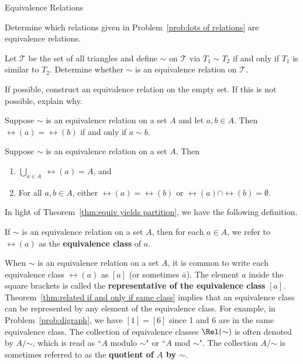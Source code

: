 \begin{section}{Equivalence Relations}
\begin{problem}\label{prob:equiv from lots of relations}
Determine which relations given in Problem~\ref{prob:lots of relations} are equivalence relations.
\end{problem}

\begin{problem}
Let $\mathcal{T}$ be the set of all triangles and define $\sim$ on $\mathcal{T}$ via $T_1\sim T_2$ if and only if $T_1$ is similar to $T_2$.  Determine whether $\sim$ is an equivalence relation on $\mathcal{T}$.
\end{problem}

\begin{problem}
If possible, construct an equivalence relation on the empty set.  If this is not possible, explain why.
\end{problem}

\begin{theorem}\label{thm:related if and only if same class}
Suppose $\sim$ is an equivalence relation on a set $A$ and let $a,b\in A$.  Then $\rel(a)=\rel(b)$ if and only if $a\sim b$.
\end{theorem}

\begin{theorem}\label{thm:equiv yields partition}
Suppose $\sim$ is an equivalence relation on a set $A$.  Then
\begin{enumerate}[label=\textrm{(\alph*)}]
\item $\displaystyle \bigcup_{a\in A}\ \rel(a)=A$, and
\item\label{thm:equiv yields partition b} For all $a,b\in A$, either $\rel(a)=\rel(b)$ or $\rel(a)\cap \rel(b)=\emptyset$.
\end{enumerate}
\end{theorem}

In light of Theorem~\ref{thm:equiv yields partition}, we have the following definition.

\begin{definition}\label{def:equivalence class}
If $\sim$ is an equivalence relation on a set $A$, then for each $a\in A$, we refer to $\rel(a)$ as the \textbf{equivalence class} of $a$.
\end{definition}

When $\sim$ is an equivalence relation on a set $A$, it is common to write each equivalence class $\rel(a)$ as $\boxed{[a]}$ (or sometimes $\overline{a}$). The element $a$ inside the square brackets is called the \textbf{representative of the equivalence class} $[a]$.  Theorem~\ref{thm:related if and only if same class} implies that an equivalence class can be represented by any element of the equivalence class.  For example, in Problem~\ref{prob:digraph}, we have $[1]=[6]$ since 1 and 6 are in the same equivalence class. The collection of equivalence classes $\Rel(\sim)$ is often denoted by $\boxed{A/\mathord\sim}$, which is read as ``$A$ modulo $\sim$" or ``$A$ mod $\sim$".  The collection $A/\mathord\sim$ is sometimes referred to as the \textbf{quotient of $A$ by $\sim$}.


\end{section}
